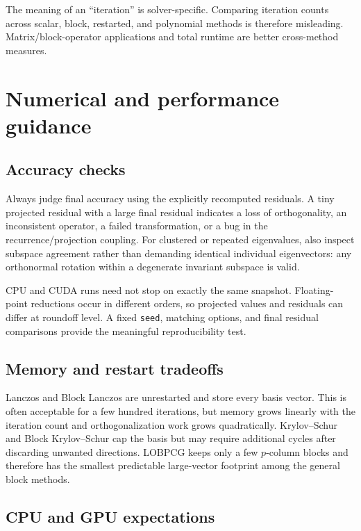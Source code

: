 \documentclass[11pt]{article}
\newcommand{\code}[1]{\texttt{#1}}
\begin{document}
The meaning of an ``iteration'' is solver-specific.  Comparing iteration
counts across scalar, block, restarted, and polynomial methods is therefore
misleading.  Matrix/block-operator applications and total runtime are better
cross-method measures.

\section{Numerical and performance guidance}

\subsection{Accuracy checks}

Always judge final accuracy using the explicitly recomputed residuals.  A tiny
projected residual with a large final residual indicates a loss of
orthogonality, an inconsistent operator, a failed transformation, or a bug in
the recurrence/projection coupling.  For clustered or repeated eigenvalues,
also inspect subspace agreement rather than demanding identical individual
eigenvectors: any orthonormal rotation within a degenerate invariant subspace is
valid.

CPU and CUDA runs need not stop on exactly the same snapshot.  Floating-point
reductions occur in different orders, so projected values and residuals can
differ at roundoff level.  A fixed \code{seed}, matching options, and final
residual comparisons provide the meaningful reproducibility test.

\subsection{Memory and restart tradeoffs}

Lanczos and Block Lanczos are unrestarted and store every basis vector.  This is
often acceptable for a few hundred iterations, but memory grows linearly with
the iteration count and orthogonalization work grows quadratically.  Krylov--Schur
and Block Krylov--Schur cap the basis but may require additional cycles after
discarding unwanted directions.  LOBPCG keeps only a few $p$-column blocks and
therefore has the smallest predictable large-vector footprint among the
general block methods.

\subsection{CPU and GPU expectations}
\end{document}
